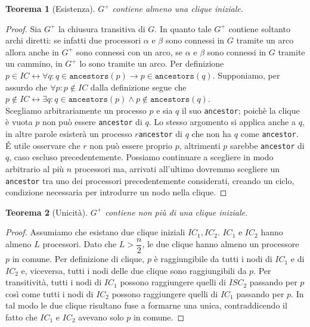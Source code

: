 \documentclass{article}
\newtheorem{teorema}{Teorema}
\begin{document}
\begin{teorema}[Esistenza]$G^+$ contiene almeno una clique iniziale.\end{teorema}
\begin{proof}
Sia $G^+$ la chiusura transitiva di $G$. In quanto tale $G^+$ contiene soltanto archi diretti: se infatti due processori $\alpha$ e $\beta$ sono connessi in $G$ tramite un arco allora anche in $G^+$ sono connessi con un arco, se $\alpha$ e $\beta$ sono connessi in $G$ tramite un cammino, in $G^+$ lo sono tramite un arco. Per definizione $p\in IC\leftrightarrow\forall q: q\in\texttt{ancestors}(p)\rightarrow p\in\texttt{ancestors}(q)$. Supponiamo, per assurdo che $\forall p: p\not\in IC$ dalla definizione segue che $p\not\in IC\leftrightarrow\exists q: q\in\texttt{ancestors}(p)\wedge p\not\in\texttt{ancestors}(q)$.\\
Scegliamo arbitrariamente un processo $p$ e sia $q$ il suo \texttt{ancestor}; poichè la clique è vuota $p$ non può essere \texttt{ancestor} di $q$. Lo stesso argomento si applica anche a $q$, in altre parole esisterà un processo $r$\texttt{ancestor} di $q$ che non ha $q$ come \texttt{ancestor}. \'E utile osservare che $r$ non può essere proprio $p$, altrimenti $p$ sarebbe \texttt{ancestor} di $q$, caso escluso precedentemente. Possiamo continuare a scegliere in modo arbitrario al più $n$ processori ma, arrivati all'ultimo dovremmo scegliere un \texttt{ancestor} tra uno dei processori precedentemente considerati, creando un ciclo, condizione necessaria per introdurre un nodo nella clique. 
\end{proof}

\begin{teorema}[Unicità]$G^+$ contiene non più di una clique iniziale.\end{teorema}
\begin{proof}
Assumiamo che esistano due clique iniziali $IC_1, IC_2$.
$IC_1$ e $IC_2$ hanno almeno $L$ processori. Dato che $L>\dfrac{n}{2}$, le due clique hanno almeno un processore $p$ in comune. Per definizione di clique, $p$ è raggiungibile da tutti i nodi di $IC_1$ e di $IC_2$ e, viceversa, tutti i nodi delle due clique sono raggiungibili da $p$. Per transitività, tutti i nodi di $IC_1$ possono raggiungere quelli di $ISC_2$ passando per $p$ così come tutti i nodi di $IC_2$ possono raggiungere quelli di $IC_1$ passando per $p$. In tal modo le due clique risultano fuse a formarne una unica, contraddicendo il fatto che $IC_1$ e $IC_2$ avevano solo $p$ in comune. 
\end{proof}
\end{document}
